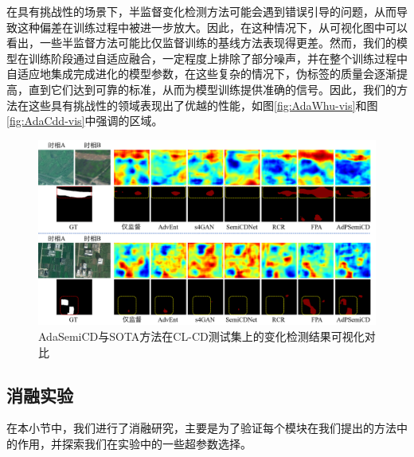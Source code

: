 \documentclass[lang=chs, degree=master, blindreview=false, adobe=false]{yanputhesis}
\begin{document}
在具有挑战性的场景下，半监督变化检测方法可能会遇到错误引导的问题，从而导致这种偏差在训练过程中被进一步放大。因此，在这种情况下，从可视化图中可以看出，一些半监督方法可能比仅监督训练的基线方法表现得更差。然而，我们的模型在训练阶段通过自适应融合，一定程度上排除了部分噪声，并在整个训练过程中自适应地集成完成进化的模型参数，在这些复杂的情况下，伪标签的质量会逐渐提高，直到它们达到可靠的标准，从而为模型训练提供准确的信号。因此，我们的方法在这些具有挑战性的领域表现出了优越的性能，如图\ref{fig:AdaWhu-vis}和图\ref{fig:AdaCdd-vis}中强调的区域。
\begin{figure}[!htbp]
  \centering
  \includegraphics[scale=0.45]{images/AdaCl-vis.png}
  \caption{
    AdaSemiCD与SOTA方法在CL-CD测试集上的变化检测结果可视化对比
  }
  \label{fig:AdaCl-vis}
  \end{figure}
\subsection{消融实验}
在本小节中，我们进行了消融研究，主要是为了验证每个模块在我们提出的方法中的作用，并探索我们在实验中的一些超参数选择。
\end{document}
